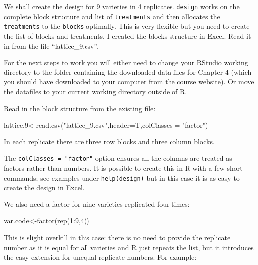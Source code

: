 \documentclass[
]{book}
\makeatletter
\newenvironment{Shaded}{\begin{snugshade}}{\end{snugshade}}
\newcommand{\AttributeTok}[1]{\textcolor[rgb]{0.77,0.63,0.00}{#1}}
\newcommand{\DecValTok}[1]{\textcolor[rgb]{0.00,0.00,0.81}{#1}}
\newcommand{\FloatTok}[1]{\textcolor[rgb]{0.00,0.00,0.81}{#1}}
\newcommand{\FunctionTok}[1]{\textcolor[rgb]{0.00,0.00,0.00}{#1}}
\newcommand{\NormalTok}[1]{#1}
\newcommand{\OtherTok}[1]{\textcolor[rgb]{0.56,0.35,0.01}{#1}}
\newcommand{\SpecialCharTok}[1]{\textcolor[rgb]{0.00,0.00,0.00}{#1}}
\newcommand{\StringTok}[1]{\textcolor[rgb]{0.31,0.60,0.02}{#1}}
\newenvironment{kframe}{%
\medskip{}
\setlength{\fboxsep}{.8em}
 \def\at@end@of@kframe{}%
 \ifinner\ifhmode%
  \def\at@end@of@kframe{\end{minipage}}%
  \begin{minipage}{\columnwidth}%
 \fi\fi%
 \def\FrameCommand##1{\hskip\@totalleftmargin \hskip-\fboxsep
 \colorbox{shadecolor}{##1}\hskip-\fboxsep
     \hskip-\linewidth \hskip-\@totalleftmargin \hskip\columnwidth}%
 \MakeFramed {\advance\hsize-\width
   \@totalleftmargin\z@ \linewidth\hsize
   \@setminipage}}%
 {\par\unskip\endMakeFramed%
 \at@end@of@kframe}
\newenvironment{rmdblock}[1]
  {
  \begin{itemize}
  \renewcommand{\labelitemi}{
    \raisebox{-.7\height}[0pt][0pt]{
      {\setkeys{Gin}{width=3em,keepaspectratio}\texttt{[image: images/\#1]}}
    }
  }
  \setlength{\fboxsep}{1em}
  \begin{kframe}
  \item
  }
  {
  \end{kframe}
  \end{itemize}
  }
\newenvironment{rmdimportant}
  {\begin{rmdblock}{important}}
  {\end{rmdblock}}
\makeatother
\begin{document}
We shall create the design for 9 varieties in 4 replicates. \texttt{design} works on the complete block structure and list of \texttt{treatments} and then allocates the \texttt{treatments} to the \texttt{blocks} optimally. This is very flexible but you need to create the list of blocks and treatments, I created the blocks structure in Excel. Read it in from the file ``lattice\_9.csv''.

\begin{rmdimportant}
For the next steps to work you will either need to change your RStudio working directory to the folder containing the downloaded data files for Chapter 4 (which you should have downloaded to your computer from the course website). Or move the datafiles to your current working directory outside of R.
\end{rmdimportant}

Read in the block structure from the existing file:

\begin{Shaded}
\begin{Highlighting}[]
\NormalTok{lattice}\FloatTok{.9}\OtherTok{\textless{}{-}}\FunctionTok{read.csv}\NormalTok{(}\StringTok{"lattice\_9.csv"}\NormalTok{,}\AttributeTok{header=}\NormalTok{T,}\AttributeTok{colClasses =} \StringTok{"factor"}\NormalTok{)}
\end{Highlighting}
\end{Shaded}

In each replicate there are three row blocks and three column blocks.

The \texttt{colClasses\ =\ "factor"} option ensures all the columns are treated as factors rather than numbers. It is possible to create this in R with a few short commands; see examples under \texttt{help(design)} but in this case it is as easy to create the design in Excel.

We also need a factor for nine varieties replicated four times:

\begin{Shaded}
\begin{Highlighting}[]
\NormalTok{var.code}\OtherTok{\textless{}{-}}\FunctionTok{factor}\NormalTok{(}\FunctionTok{rep}\NormalTok{(}\DecValTok{1}\SpecialCharTok{:}\DecValTok{9}\NormalTok{,}\DecValTok{4}\NormalTok{))}
\end{Highlighting}
\end{Shaded}

This is slight overkill in this case: there is no need to provide the replicate number as it is equal for all varieties and R just repeats the list, but it introduces the easy extension for unequal replicate numbers. For example:
\end{document}
